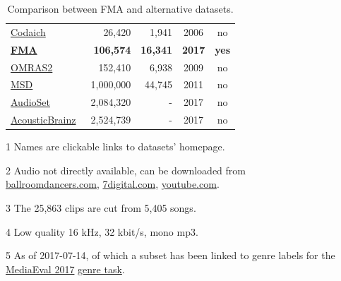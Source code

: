 \documentclass{article}
\newcommand{\ntracks}{106,574 }
\newcommand{\nartists}{16,341 }
\newcommand{\weblink}{https://github.com/mdeff/fma}
\begin{document}
\begin{table}[t]
\begin{threeparttable}
\begin{tabular}{l@{ }rrcc}
		\href{http://jmir.sourceforge.net/index_Codaich.html}{Codaich}~\cite{codaich} & 26,420 & 1,941 & 2006 & no \\ %
		\bf \href{\weblink}{FMA} & \bf \ntracks & \bf \nartists & \bf 2017 & \bf yes \\
		\href{http://www.omras2.org/}{OMRAS2}~\cite{omras} & 152,410 & 6,938 & 2009 & no \\
		\href{https://labrosa.ee.columbia.edu/millionsong/}{MSD}~\cite{msd} & 1,000,000 & 44,745 & 2011 & no\tnote{2} \\
		\href{https://research.google.com/audioset/}{AudioSet}~\cite{audioset} & 2,084,320 & - & 2017 & no\tnote{2} \\
		\href{https://acousticbrainz.org}{AcousticBrainz}~\cite{acousticbrainz} & 2,524,739\tnote{5} & - & 2017 & no \\
		\bottomrule
	\end{tabular}
	\begin{tablenotes}
		\item[1] Names are clickable links to datasets' homepage.
		\item[2] Audio not directly available, can be downloaded from \\ \href{http://www.ballroomdancers.com}{ballroomdancers.com}, \href{https://www.7digital.com}{7digital.com}, \href{https://www.youtube.com}{youtube.com}.
		\item[3] The 25,863 clips are cut from 5,405 songs.
		\item[4] Low quality 16 kHz, 32 kbit/s, mono mp3.
		\item[5] As of 2017-07-14, of which a subset has been linked to genre labels for the \href{http://www.multimediaeval.org/mediaeval2017}{MediaEval 2017} \href{https://multimediaeval.github.io/2017-AcousticBrainz-Genre-Task}{genre task}.
	\end{tablenotes}
	\end{threeparttable}
	\caption{Comparison between FMA and alternative datasets.}
	\label{tab:datasets}
\end{table}
\end{document}
